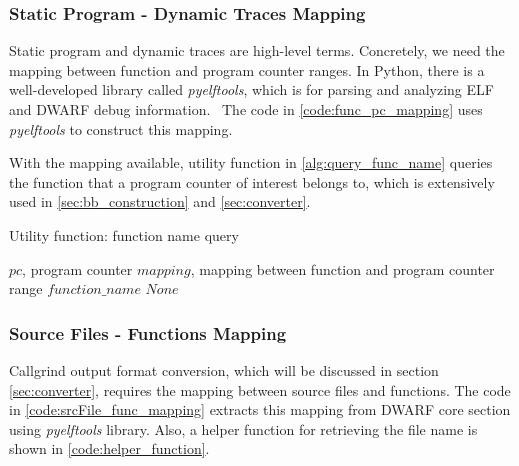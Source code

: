 \subsubsection{Static Program - Dynamic Traces Mapping}
\label{sec:pc_func_mapping}

Static program and dynamic traces are high-level terms. Concretely, we need the mapping between function and program counter ranges. In Python, there is a well-developed library called \textit{pyelftools}, which is for parsing and analyzing ELF and DWARF debug information.~\cite{pyelftools_manual} The code in \cref{code:func_pc_mapping} uses \textit{pyelftools} to construct this mapping.

With the mapping available, utility function in \cref{alg:query_func_name} queries the function that a program counter of interest belongs to, which is extensively used in \cref{sec:bb_construction} and \cref{sec:converter}.

\medskip
\begin{algorithm}
\caption{Utility function: function name query}
\label{alg:query_func_name}
\begin{algorithmic}
\REQUIRE $pc$, program counter
\REQUIRE $mapping$, mapping between function and program counter range
        \RETURN $function\_name$
    \ELSE
        \RETURN $None$
    \ENDIF
\ENDFOR
\end{algorithmic}
\end{algorithm}

\subsubsection{Source Files - Functions Mapping}
Callgrind output format conversion, which will be discussed in section \cref{sec:converter}, requires the mapping between source files and functions. The code in  \cref{code:srcFile_func_mapping} extracts this mapping from DWARF core section using \textit{pyelftools} library. Also, a helper function for retrieving the file name is shown in  \cref{code:helper_function}.

\medskip

